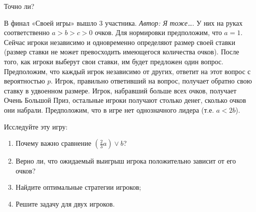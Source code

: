 \begin{problem}
\begin{source}
\cite{lones:dtc} {\red Точно ли?}
\end{source}
В финал «Своей игры» вышло 3 участника. { {\it Автор: Я тоже\ldots}}. У них на руках соответственно $a>b>c>0$ очков. Для нормировки предположим, что $a=1$. Сейчас игроки независимо и одновременно определяют размер своей ставки (размер ставки не может превосходить имеющегося количества очков). После того, как игроки выберут свои ставки, им будет предложен один вопрос. Предположим, что каждый игрок независимо от других, ответит на этот вопрос с вероятностью $p$. Игрок, правильно ответивший на вопрос, получает обратно свою ставку в удвоенном размере. Игрок, набравший больше всех очков, получает Очень Большой Приз, остальные игроки получают столько денег, сколько очков они набрали. Предположим, что в игре нет однозначного лидера (т.е. $a<2b$). \par
Исследуйте эту игру: \par
\begin{enumerate}
\item  Почему важно сравнение $\left(\frac{2}{3}a\right) \vee b$? \par
\item Верно ли, что ожидаемый выигрыш игрока положительно зависит от его очков? \par
\item  Найдите оптимальные стратегии игроков; \par
\item Решите задачу для двух игроков. \par
\end{enumerate}



\begin{sol}

\end{sol}
\end{problem}





